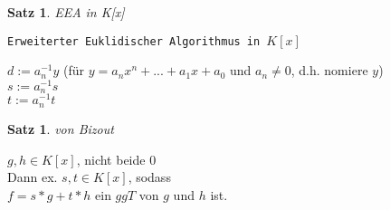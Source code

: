\documentclass[a4paper,11pt]{article}
\newtheorem{satz}[definition]{Satz}
\begin{document}
\newpage

\begin{satz}
	EEA in K[x]
\end{satz}
\begin{algorithm}[!h]
	\caption{\texttt{Erweiterter Euklidischer Algorithmus in $K[x]$}}
	$d:=a^{-1}_ny$ (für $y=a_nx^n+...+a_1x+a_0$ und $a_n\neq0$, d.h. nomiere $y$) \\
	$s:=a^{-1}_ns$ \\
	$t:=a^{-1}_nt$
\end{algorithm}

\begin{satz}
	von Bizout
\end{satz}
$g,h\in K[x]$, nicht beide 0 \\
Dann ex. $s,t\in K[x]$, sodass \\
$f=s*g+t*h$ ein $ggT$ von $g$ und $h$ ist.

\newpage
\end{document}
